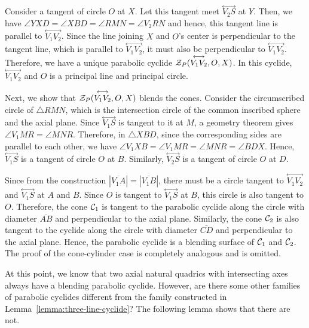      Consider a tangent of circle $O$ at $X$.  Let this tangent
meet $\stackrel{\longleftrightarrow}{V_2S}$ at $Y$.  Then, we have
$\angle YXD=\angle XBD=\angle RMN=\angle V_2RN$ and hence, this tangent line
is parallel to $\stackrel{\longleftrightarrow}{V_1V_2}$.  Since the line
joining $X$ and $O$'s center is perpendicular to the tangent line, which is
parallel to $\stackrel{\longleftrightarrow}{V_1V_2}$, it must also be 
perpendicular to $\stackrel{\longleftrightarrow}{V_1V_2}$.
Therefore, we have a unique parabolic cyclide
${\cal Z}_P(\stackrel{\longleftrightarrow}{V_1V_2},O,X)$.  In this cyclide,
$\stackrel{\longleftrightarrow}{V_1V_2}$ and $O$ is a principal line and
principal circle.  

    Next, we show that ${\cal Z}_P(\stackrel{\longleftrightarrow}{V_1V_2},O,X)$
blends the cones.
Consider the circumscribed circle of $\bigtriangleup RMN$, which is the
intersection circle of the common inscribed sphere and the axial plane.
Since $\stackrel{\longleftrightarrow}{V_1S}$ is tangent to it at $M$, a
geometry theorem gives $\angle V_1MR=\angle MNR$.  Therefore, in
$\bigtriangleup XBD$, since the corresponding sides are parallel to each other,
we have $\angle V_1XB=\angle V_1MR=\angle MNR=\angle BDX$.  Hence,
$\stackrel{\longleftrightarrow}{V_1S}$ is a tangent of circle $O$ at $B$.
Similarly, $\stackrel{\longleftrightarrow}{V_2S}$ is a tangent of circle $O$
at $D$.

     Since from the construction 
$|\overline{V_1A}|=|\overline{V_1B}|$, there must be a circle tangent to 
$\stackrel{\longleftrightarrow}{V_1V_2}$ and 
$\stackrel{\longleftrightarrow}{V_1S}$ at $A$ and $B$.
Since $O$ is tangent to $\stackrel{\longleftrightarrow}{V_1S}$ at $B$, this 
circle is also tangent to $O$.  Therefore, the cone ${\cal C}_1$ is tangent
to the parabolic cyclide along the circle with diameter $\overline{AB}$ and
perpendicular to the axial plane.  Similarly, the cone ${\cal C}_2$ is
also tangent to the cyclide along the circle with diameter $\overline{CD}$
and perpendicular to the axial plane.  Hence, the parabolic cyclide
is a blending surface of ${\cal C}_1$ and ${\cal C}_2$.
The proof of the cone-cylinder case is completely analogous and is 
omitted. \QED

     At this point, we know that two axial natural quadrics with intersecting
axes always have a blending parabolic cyclide.
However, are there some other families of parabolic cyclides
different from the family constructed in Lemma~\ref{lemma:three-line-cyclide}?
The following lemma shows that there are not.

